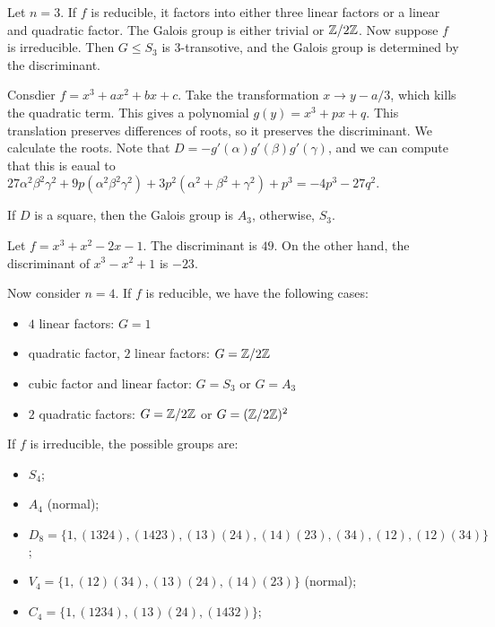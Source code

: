 \documentclass[10pt, twoside]{article}
\begin{document}
        Let $n=3$. If $f$ is reducible, it factors into either three linear factors or a linear and quadratic factor. The Galois group is either trivial or $\mathbb{Z}/2\mathbb{Z}$. Now suppose $f$ is irreducible. Then $G \leq S_3$ is $3$-transotive, and the Galois group is determined by the discriminant. 

        Consdier $f = x^3 + ax^2 + bx + c$. Take the transformation $x \to y-a/3$, which kills the quadratic term. This gives a polynomial $g(y) = x^3 + px + q$. This translation preserves differences of roots, so it preserves the discriminant. We calculate the roots. Note that $D = -g'(\alpha)g'(\beta)g'(\gamma)$, and we can compute that this is eaual to $27 \alpha^2 \beta^2 \gamma^2 + 9p(\alpha^2 \beta^2 \gamma^2) + 3p^2 (\alpha^2 + \beta^2 + \gamma^2) + p^3 = -4p^3 - 27q^2$.

        If $D$ is a square, then the Galois group is $A_3$, otherwise, $S_3$.

        \begin{exm}
            Let $f = x^3+x^2-2x-1$. The discriminant is $49$. On the other hand, the discriminant of $x^3-x^2 + 1$ is $-23$.
        \end{exm}

        Now consider $n = 4$. If $f$ is reducible, we have the following cases:
        \begin{itemize}
            \item $4$ linear factors: $G = 1$
            \item quadratic factor, $2$ linear factors: $G = \mathbb{Z}/2\mathbb{Z}$
            \item cubic factor and linear factor: $G = S_3$ or $G = A_3$
            \item $2$ quadratic factors: $G = \mathbb{Z}/2\mathbb{Z}$ or $G = (\mathbb{Z}/2\mathbb{Z})^2$
        \end{itemize}

        If $f$ is irreducible, the possible groups are:
        \begin{itemize}
            \item $S_4$;
            \item $A_4$ (normal);
            \item $D_8 = \{1, (1324), (1423), (13)(24), (14)(23), (34), (12), (12)(34) \}$;
            \item $V_4 = \{ 1, (12)(34), (13)(24), (14)(23) \}$ (normal);
            \item $C_4 = \{1, (1234), (13)(24), (1432)\}$;
        \end{itemize}
\end{document}
